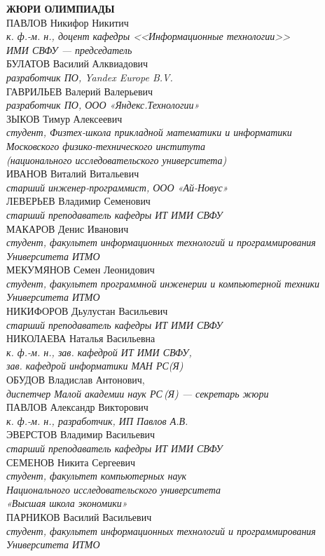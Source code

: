 \noindent
\textbf{ЖЮРИ ОЛИМПИАДЫ}
\\[2mm]
ПАВЛОВ Никифор Никитич \\
\textit{к. ф.-м. н., доцент кафедры <<Информационные технологии>>\\ ИМИ СВФУ --- председатель}
\\[2mm]
БУЛАТОВ Василий Алквиадович\\
\textit{разработчик ПО, Yandex Europe B.V.}
\\[2mm]
ГАВРИЛЬЕВ Валерий Валерьевич\\
\textit{разработчик ПО, ООО «Яндекс.Технологии»}
\\[2mm]
ЗЫКОВ Тимур Алексеевич\\ 
\textit{студент, Физтех-школа прикладной математики и информатики \\
Московского физико-технического института \\
(национального исследовательского университета)}
\\[2mm]
ИВАНОВ Виталий Витальевич\\
\textit{старший инженер-программист, ООО «Ай-Новус»}
\\[2mm]
ЛЕВЕРЬЕВ Владимир Семенович \\
\textit{старший преподаватель кафедры ИТ ИМИ СВФУ}
\\[2mm]
МАКАРОВ Денис Иванович\\
\textit{студент, факультет информационных технологий и программирования Университета ИТМО}
\\[2mm]
МЕКУМЯНОВ Семен Леонидович\\
\textit{студент, факультет программной инженерии и компьютерной техники Университета ИТМО}
\\[2mm]
НИКИФОРОВ Дьулустан Васильевич \\
\textit{старший преподаватель кафедры ИТ ИМИ СВФУ}
\\[2mm]
НИКОЛАЕВА Наталья Васильевна \\
\textit{к. ф.-м. н., зав. кафедрой ИТ ИМИ СВФУ,\\
зав. кафедрой информатики МАН РС(Я)}
\\[2mm]
ОБУДОВ Владислав Антонович, \\
\textit{диспетчер  Малой академии наук РС\,(Я) --- секретарь жюри}
\\[2mm]
ПАВЛОВ Александр Викторович \\
\textit{к. ф.-м. н., разработчик, ИП Павлов А.В.}
\\[2mm]
ЭВЕРСТОВ Владимир Васильевич \\
\textit{старший преподаватель кафедры ИТ ИМИ СВФУ}
\\[2mm]
СЕМЕНОВ Никита Сергеевич\\
\textit{студент, факультет компьютерных наук \\
Национального исследовательского университета \\
«Высшая школа экономики»}
\\[2mm]
ПАРНИКОВ Василий Васильевич\\
\textit{студент, факультет информационных технологий и программирования Университета ИТМО}

